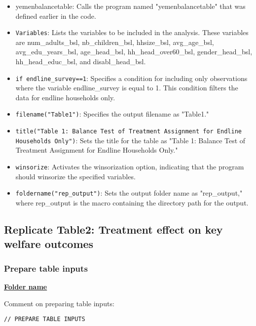 \documentclass{article}
\begin{document}
\begin{itemize}
    \item yemenbalancetable: Calls the program named "yemenbalancetable" that was defined earlier in the code.
    \item \texttt{Variables}: Lists the variables to be included in the analysis. These variables are num\_adults\_bsl, nb\_children\_bsl, hhsize\_bsl, avg\_age\_bsl, avg\_edu\_years\_bsl, age\_head\_bsl, hh\_head\_over60\_bsl, gender\_head\_bsl, hh\_head\_educ\_bsl, and disabl\_head\_bsl.
    \item \texttt{if endline\_survey==1}: Specifies a condition for including only observations where the variable endline\_survey is equal to 1. This condition filters the data for endline households only.
    \item \texttt{filename("Table1")}: Specifies the output filename as "Table1."
    \item \texttt{title("Table 1: Balance Test of Treatment Assignment for Endline Households Only")}: Sets the title for the table as "Table 1: Balance Test of Treatment Assignment for Endline Households Only."
    \item \texttt{winsorize}: Activates the winsorization option, indicating that the program should winsorize the specified variables.
    \item \texttt{foldername("rep\_output")}: Sets the output folder name as "rep\_output," where rep\_output is the macro containing the directory path for the output.
\end{itemize}

\subsection{Replicate Table2: Treatment effect on key welfare outcomes}

\subsubsection{Prepare table inputs}

\underline{\textbf{Folder name}}

\vspace{0.3cm} Comment on preparing table inputs: 

\begin{mdframed}
\begin{verbatim}
// PREPARE TABLE INPUTS
\end{verbatim}
\end{mdframed}
\end{document}
